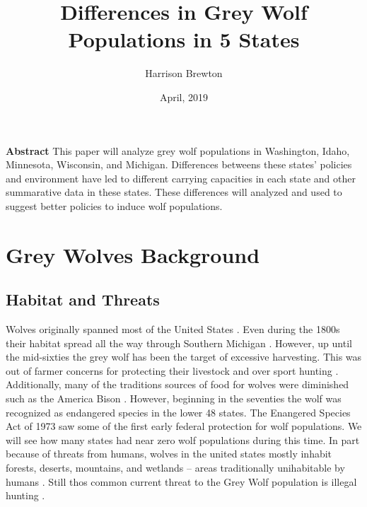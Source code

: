 \documentclass[12pt]{article}
\title{Differences in Grey Wolf Populations in 5 States}
\date{April, 2019}
\author{Harrison Brewton}
\begin{document}
\maketitle
\textbf{Abstract}
This paper will analyze grey wolf populations in 
    Washington, Idaho, Minnesota, Wisconsin, and Michigan.
Differences betweens these states' policies and environment
    have led to different carrying capacities in each state
    and other summarative data in these states.
These differences will analyzed and used to suggest better policies to induce wolf populations.

\section{Grey Wolves Background}

\subsection{Habitat and Threats}
Wolves originally spanned most of the United States \cite{Biologue}.
Even during the 1800s their habitat spread all the way through Southern Michigan \cite{2015PlanMI}.
However, up until the mid-sixties the grey wolf has been the target of excessive harvesting.
This was out of farmer concerns for protecting their livestock and over sport hunting \cite{Biologue}.
Additionally, many of the traditions sources of food for wolves were diminished such as the America Bison \cite{WikiWolf}.
However, beginning in the seventies the wolf was recognized as endangered species in the lower 48 states.
The Enangered Species Act of 1973 saw some of the first early federal protection for wolf populations.
We will see how many states had near zero wolf populations during this time.
In part because of threats from humans,
wolves in the united states mostly inhabit forests, deserts, mountains, and wetlands --
areas traditionally unihabitable by humans \cite{Stats}.
Still thos common current threat to the Grey Wolf population is illegal hunting \cite{2018ReportOR}.
\end{document}

